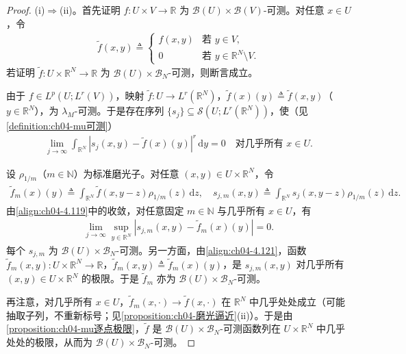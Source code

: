 \documentclass[../../main.tex]{subfiles}%
\begin{document}
\begin{proof}
(i)$\Rightarrow$(ii)。首先证明 $f:U\times V\to\mathbb{R}$ 为 $\mathcal{B}(U)\times\mathcal{B}(V)$-可测。对任意 $x\in U$，令
\begin{align*}
\tilde f(x,y)\triangleq \begin{cases}
f(x,y) & \text{若 }y\in V,\\
0 & \text{若 }y\in\mathbb{R}^N\setminus V.
\end{cases}
\end{align*}
若证明 $\tilde f:U\times\mathbb{R}^N\to\mathbb{R}$ 为 $\mathcal{B}(U)\times\mathcal{B}_N$-可测，则断言成立。

由于 $f\in L^p(U;L^r(V))$，映射 $\tilde f:U\to L^r(\mathbb{R}^N)$，$\tilde f(x)(y)\triangleq \tilde f(x,y)$（$y\in\mathbb{R}^N$），为 $\lambda_M$-可测。于是存在序列 $\{s_j\}\subseteq\mathcal{S}(U;L^r(\mathbb{R}^N))$，使（见\cref{definition:ch04-mu可测}）
\begin{align}
\lim_{j\to\infty}\int_{\mathbb{R}^N}|s_j(x,y)-\tilde f(x)(y)|^r\,\mathrm{d}y=0\quad\text{对几乎所有 }x\in U. \label{align:ch04-4.119}
\end{align}

设 $\rho_{1/m}$（$m\in\mathbb{N}$）为标准磨光子。对任意 $(x,y)\in U\times\mathbb{R}^N$，令
\begin{align}
\tilde f_m(x)(y)\triangleq \int_{\mathbb{R}^N}\tilde f(x,y-z)\rho_{1/m}(z)\,\mathrm{d}z,\quad
s_{j,m}(x,y)\triangleq \int_{\mathbb{R}^N}s_j(x,y-z)\rho_{1/m}(z)\,\mathrm{d}z. \label{align:ch04-4.120}
\end{align}
由\eqref{align:ch04-4.119}中的收敛，对任意固定 $m\in\mathbb{N}$ 与几乎所有 $x\in U$，有
\begin{align}
\lim_{j\to\infty}\sup_{y\in\mathbb{R}^N}|s_{j,m}(x,y)-\tilde f_m(x)(y)|=0. \label{align:ch04-4.121}
\end{align}
每个 $s_{j,m}$ 为 $\mathcal{B}(U)\times\mathcal{B}_N$-可测。另一方面，由\eqref{align:ch04-4.121}，函数 $\tilde f_m(x,y):U\times\mathbb{R}^N\to\mathbb{R}$，$\tilde f_m(x,y)\triangleq \tilde f_m(x)(y)$，是 $s_{j,m}(x,y)$ 对几乎所有 $(x,y)\in U\times\mathbb{R}^N$ 的极限。于是 $\tilde f_m$ 亦为 $\mathcal{B}(U)\times\mathcal{B}_N$-可测。

再注意，对几乎所有 $x\in U$，$\tilde f_m(x,\cdot)\to\tilde f(x,\cdot)$ 在 $\mathbb{R}^N$ 中几乎处处成立（可能抽取子列，不重新标号；见\cref{proposition:ch04-磨光逼近}(ii)）。于是由\cref{proposition:ch04-mu逐点极限}，$\tilde f$ 是 $\mathcal{B}(U)\times\mathcal{B}_N$-可测函数列在 $U\times\mathbb{R}^N$ 中几乎处处的极限，从而为 $\mathcal{B}(U)\times\mathcal{B}_N$-可测。


\end{proof}
\end{document}
